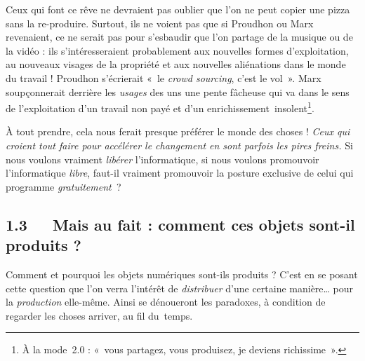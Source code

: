 \documentclass{FramateX}
\begin{document}
\begin{refsection}
Ceux qui font ce rêve ne devraient pas oublier que l'on ne peut copier
une pizza sans la re-produire. Surtout, ils ne voient pas que si
Proudhon ou Marx revenaient, ce ne serait pas pour s'esbaudir que l'on
partage de la musique ou de la vidéo : ils s'intéresseraient
probablement aux nouvelles formes d'exploitation, au nouveaux visages
de la propriété et aux nouvelles aliénations dans le monde du travail !
Proudhon s'écrierait «~le \textit{crowd sourcing}, c'est le vol~». Marx
soupçonnerait derrière les\textit{ usages} des uns une pente fâcheuse
qui va dans le sens de l'exploitation d'un travail non payé et d'un
enrichissement~insolent\footnote{À la mode~2.0 : «~vous partagez,
vous produisez, je deviens richissime~».}.

À tout prendre, cela nous ferait presque préférer le monde des choses !
\textit{Ceux qui croient tout faire pour accélérer le changement en
sont parfois les pires freins.} Si nous voulons vraiment
\textit{libérer} l'informatique, si nous voulons promouvoir
l'informatique \textit{libre}, faut-il vraiment promouvoir la posture
exclusive de celui qui programme \textit{gratuitement~}?

\subsection*{1.3~~~Mais au fait : comment ces objets sont-il produits ?}
{}


Comment et pourquoi les objets numériques sont-ils produits ? C'est en
se posant cette question que l'on verra l'intérêt de
\textit{distribuer} d'une certaine manière… pour la \textit{production}
elle-même. Ainsi se dénoueront les paradoxes, à condition de regarder
les choses arriver, au fil du~temps.


\end{refsection}
\end{document}
